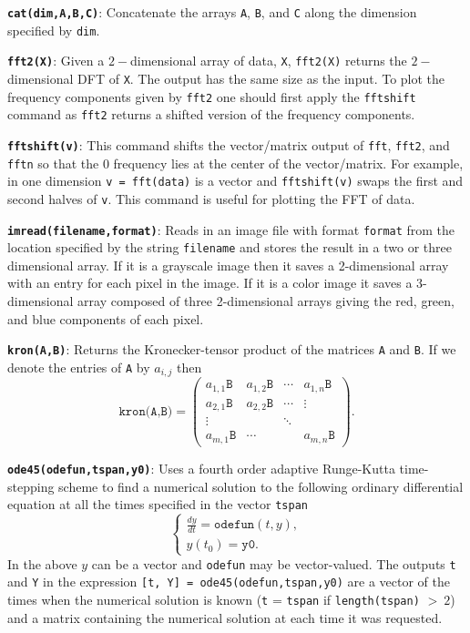 \documentclass[fleqn,10pt]{../SelfArx} %
\begin{document}
\noindent \texttt{\textbf{cat(dim,A,B,C)}}: Concatenate the arrays \texttt{A}, \texttt{B}, and \texttt{C} along the dimension specified by \texttt{dim}.
\vskip 0.3cm

\noindent \texttt{\textbf{fft2(X)}}: Given a $2-$dimensional array of data, \texttt{X}, \texttt{fft2(X)} returns the $2-$dimensional DFT of \texttt{X}. The output has the same size as the input. To plot the frequency components given by \texttt{fft2} one should first apply the \texttt{fftshift} command as \texttt{fft2} returns a shifted version of the frequency components.
\vskip 0.3cm

\noindent \texttt{\textbf{fftshift(v)}}: This command shifts the vector/matrix output of \texttt{fft}, \texttt{fft2}, and \texttt{fftn} so that the 0 frequency lies at the center of the vector/matrix. For example, in one dimension \texttt{v = fft(data)} is a vector and \texttt{fftshift(v)} swaps the first and second halves of \texttt{v}. This command is useful for plotting the FFT of data. 
\vskip 0.3cm

\noindent \texttt{\textbf{imread(filename,format)}}: Reads in an image file with format \texttt{format} from the location specified by the string \texttt{filename} and stores the result in a two or three dimensional array. If it is a grayscale image then it saves a 2-dimensional array with an entry for each pixel in the image. If it is a color image it saves a 3-dimensional array composed of three 2-dimensional arrays giving the red, green, and blue components of each pixel.
\vskip 0.3cm

\noindent \texttt{\textbf{kron(A,B)}}: Returns the Kronecker-tensor product of the matrices \texttt{A} and \texttt{B}. If we denote the entries of \texttt{A} by $a_{i,j}$ then
\[
\texttt{kron(A,B)} = \left( \begin{array}{cccc}
a_{1,1}\texttt{B} & a_{1,2}\texttt{B} & \cdots & a_{1,n}\texttt{B} \\
a_{2,1}\texttt{B} & a_{2,2}\texttt{B} & \cdots & \vdots \\
\vdots & & \ddots &  \\
a_{m,1}\texttt{B} & \cdots& & a_{m,n}\texttt{B} \end{array} \right).
\]
\vskip 0.3cm

\noindent \texttt{\textbf{ode45(odefun,tspan,y0)}}: Uses a fourth order adaptive Runge-Kutta time-stepping scheme to find a numerical solution to the following ordinary differential equation at all the times specified in the vector \texttt{tspan}
\[
	\left \{ \begin{array}{l} \frac{dy}{dt} = \texttt{odefun}(t,y), \\
	y(t_0) = \texttt{y0}. \end{array}\right .
\]
In the above $y$ can be a vector and \texttt{odefun} may be vector-valued. The outputs \texttt{t} and \texttt{Y} in the expression \texttt{[t, Y] = ode45(odefun,tspan,y0)} are a vector of the times when the numerical solution is known (\texttt{t} = \texttt{tspan} if \texttt{length(tspan)} $>~2$) and a matrix containing the numerical solution at each time it was requested.
\vskip 0.3cm
\end{document}

